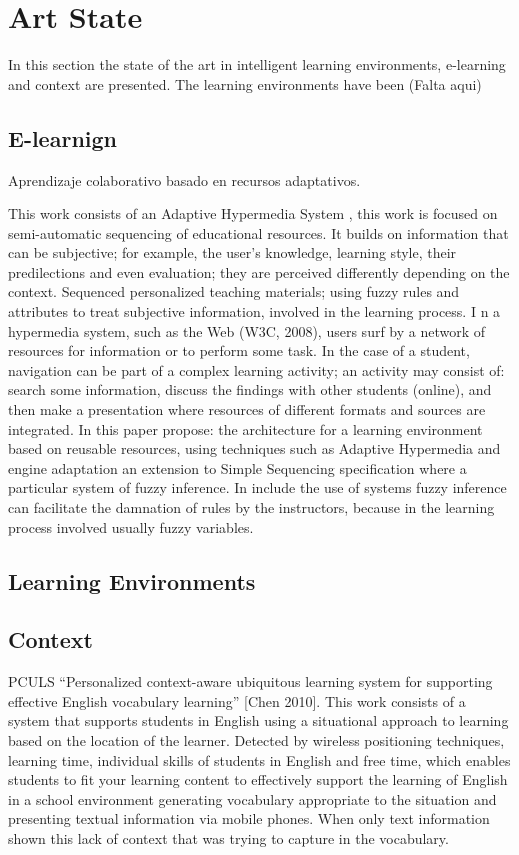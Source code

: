 \chapter{Art State} \label{artstate} 
In this section the state of the art in intelligent learning environments, e-learning and context are presented. The learning environments have been 
(Falta aqui)

\section{E-learnign}
Aprendizaje colaborativo basado en recursos adaptativos.

This work consists of an Adaptive Hypermedia System \cite{Valdez2007}, this work is focused on semi-automatic sequencing of educational resources. It builds on information that can be subjective; for example, the user's knowledge, learning style, their predilections and even evaluation; they are perceived differently depending on the context. Sequenced personalized teaching materials; using fuzzy rules and attributes to treat subjective information, involved in the learning process. I n a hypermedia system, such as the Web (W3C, 2008), users surf by  a network of resources for information or to perform some task. In the case of a student, navigation can be part of a complex learning activity; an activity may consist of: search some information, discuss the findings with other students (online), and then make a presentation where resources of different formats and sources are integrated.
In this paper propose: the architecture for a learning environment based on reusable resources, using techniques such as Adaptive Hypermedia and engine adaptation an extension to Simple Sequencing specification where a particular system of fuzzy inference. In include the use of systems fuzzy inference can facilitate the damnation of rules by the instructors, because in the learning process involved usually fuzzy variables.

\section{Learning Environments}
\section{Context}
PCULS
“Personalized context-aware ubiquitous learning system for supporting effective English vocabulary learning” [Chen 2010]. This work consists of a system that supports students in English using a situational approach to learning based on the location of the learner. Detected by wireless positioning techniques, learning time, individual skills of students in English and free time, which enables students to fit your learning content to effectively support the learning of English in a school environment generating vocabulary appropriate to the situation and presenting textual information via mobile phones. When only text information shown this lack of context that was trying to capture in the vocabulary.
 

